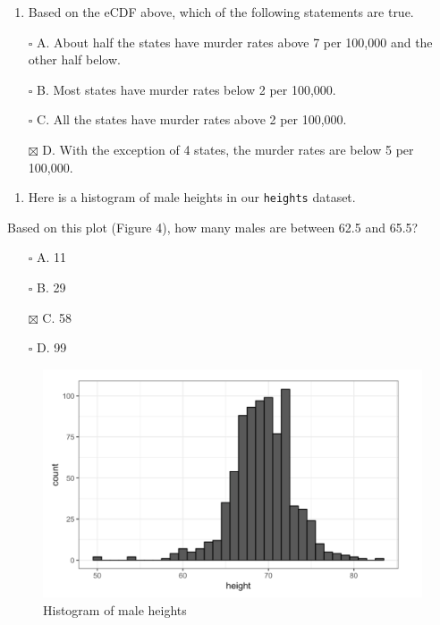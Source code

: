 \documentclass[
]{article}
\providecommand{\tightlist}{%
  \setlength{\itemsep}{0pt}\setlength{\parskip}{0pt}}
\begin{document}
\begin{enumerate}
\def\labelenumi{\arabic{enumi}.}
\setcounter{enumi}{5}
\tightlist
\item
  Based on the eCDF above, which of the following statements are true.
\end{enumerate}

\begin{itemize}
\tightlist
\item[$\square$]
  A. About half the states have murder rates above 7 per 100,000 and the
  other half below.
\item[$\square$]
  B. Most states have murder rates below 2 per 100,000.
\item[$\square$]
  C. All the states have murder rates above 2 per 100,000.
\item[$\boxtimes$]
  D. With the exception of 4 states, the murder rates are below 5 per
  100,000.
\end{itemize}

\begin{enumerate}
\def\labelenumi{\arabic{enumi}.}
\setcounter{enumi}{6}
\tightlist
\item
  Here is a histogram of male heights in our \texttt{heights} dataset.
\end{enumerate}

Based on this plot (Figure 4), how many males are between 62.5 and 65.5?

\begin{itemize}
\tightlist
\item[$\square$]
  A. 11
\item[$\square$]
  B. 29
\item[$\boxtimes$]
  C. 58
\item[$\square$]
  D. 99
\end{itemize}

\begin{figure}
\centering
\includegraphics{images/Histogram of male heights.png}
\caption{Histogram of male heights}
\end{figure}
\end{document}
